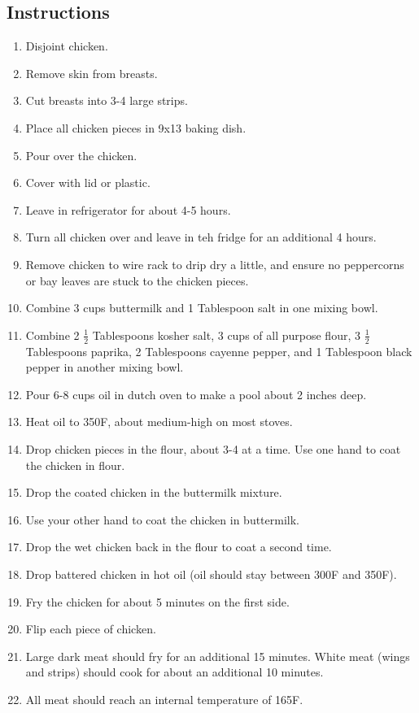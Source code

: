 \begin{multicols}{2}
\subsection*{Instructions}
\begin{enumerate}
    \item Disjoint chicken.
    \item Remove skin from breasts.
    \item Cut breasts into 3-4 large strips.
    \item Place all chicken pieces in 9x13 baking dish.
    \item Pour  over the chicken.
    \item Cover with lid or plastic.
    \item Leave in refrigerator for about 4-5 hours.
    \item Turn all chicken over and leave in teh fridge for an additional 4 hours.
    \item Remove chicken to wire rack to drip dry a little, and ensure no peppercorns or bay leaves are stuck to the chicken pieces.
    \item Combine 3 cups buttermilk and 1 Tablespoon salt in one mixing bowl.
    \item Combine 2 \( \frac{1}{2} \) Tablespoons kosher salt, 3 cups of all purpose flour, 3 \( \frac{1}{2} \) Tablespoons paprika, 2 Tablespoons cayenne pepper, and 1 Tablespoon black pepper in another mixing bowl.
    \item Pour 6-8 cups oil in dutch oven to make a pool about 2 inches deep.
    \item Heat oil to 350F, about medium-high on most stoves.
    \item Drop chicken pieces in the flour, about 3-4 at a time. Use one hand to coat the chicken in flour.
    \item Drop the coated chicken in the buttermilk mixture.
    \item Use your other hand to coat the chicken in buttermilk.
    \item Drop the wet chicken back in the flour to coat a second time.
    \item Drop battered chicken in hot oil (oil should stay between 300F and 350F).
    \item Fry the chicken for about 5 minutes on the first side.
    \item Flip each piece of chicken. 
    \item Large dark meat should fry for an additional 15 minutes. White meat (wings and strips) should cook for about an additional 10 minutes.
    \item All meat should reach an internal temperature of 165F.
\end{enumerate}


\end{multicols}

